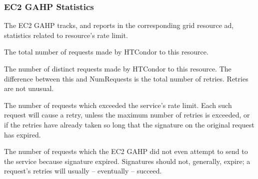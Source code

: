 \subsubsection{\label{sec:Amazon-statistics}EC2 GAHP Statistics}

The EC2 GAHP tracks, and reports in the corresponding grid resource ad,
statistics related to resource's rate limit.


\begin{description}

\item[\AdAttr{NumRequests}:]
The total number of requests made by HTCondor to this resource.

\item[\AdAttr{NumDistinctRequests}:]
The number of distinct requests made by HTCondor to this
resource.  The difference between this and NumRequests is
the total number of retries.  Retries are not unusual.

\item[\AdAttr{NumRequestsExceedingLimit}:]
The number of requests which exceeded the service's
rate limit.  Each such request will cause a retry, unless the maximum
number of retries is exceeded, or if the retries have already taken so
long that the signature on the original request has expired.

\item[\AdAttr{NumExpiredSignatures}:]
The number of requests which the EC2 GAHP did not even attempt
to send to the service because signature expired.  Signatures should not,
generally, expire; a request's retries will usually -- eventually -- succeed.

\end{description}

